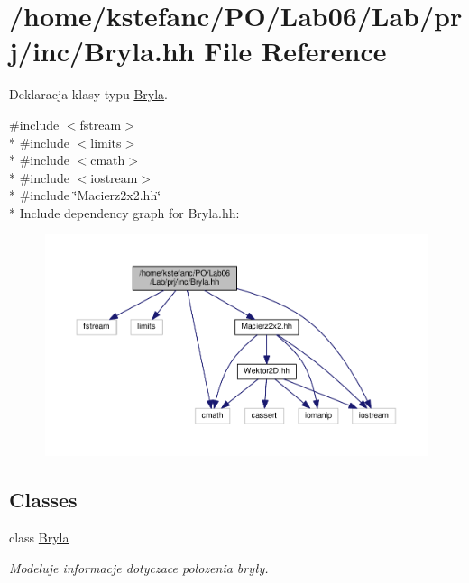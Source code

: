 \hypertarget{_bryla_8hh}{\section{/home/kstefanc/\+P\+O/\+Lab06/\+Lab/prj/inc/\+Bryla.hh File Reference}
\label{_bryla_8hh}
}


Deklaracja klasy typu \hyperlink{class_bryla}{Bryla}.  


{\ttfamily \#include $<$fstream$>$}\\*
{\ttfamily \#include $<$limits$>$}\\*
{\ttfamily \#include $<$cmath$>$}\\*
{\ttfamily \#include $<$iostream$>$}\\*
{\ttfamily \#include \char`\"{}Macierz2x2.\+hh\char`\"{}}\\*
Include dependency graph for Bryla.\+hh\+:\nopagebreak
\begin{figure}[H]
\begin{center}
\leavevmode
\includegraphics[width=350pt]{_bryla_8hh__incl}
\end{center}
\end{figure}
\subsection*{Classes}
\begin{DoxyCompactItemize}
\item 
class \hyperlink{class_bryla}{Bryla}
\begin{DoxyCompactList}\small\item\em Modeluje informacje dotyczace polozenia bryły. \end{DoxyCompactList}\end{DoxyCompactItemize}

